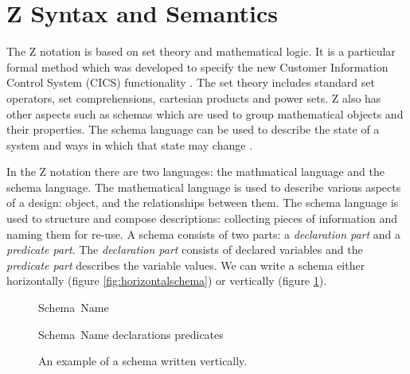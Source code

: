 \section{Z Syntax and Semantics}

The Z notation is based on set theory and mathematical logic. It is a particular formal method which was developed to specify the new Customer Information Control System (CICS) functionality \cite{cics}. The set theory includes standard set operators, set comprehensions, cartesian products and power sets. Z also has other aspects such as schemas which are used to group mathematical objects and their properties. The schema language can be used to describe the state of a system and ways in which that state may change \cite{Woodcock:1996:UZS:235337}.

In the Z notation there are two languages: the mathmatical language and the schema language. The mathematical language is used to describe various aspects of a design: object, and the relationships between them. The schema language is used to structure and compose descriptions: collecting pieces of information and naming them for re-use. A schema consists of two parts: a \emph{declaration part} and a \emph{predicate part}. The \emph{declaration part} consists of declared variables and the \emph{predicate part} describes the variable values. We can write a schema either horizontally (figure \ref{fig:horizontalschema}) or vertically (figure \ref{fig:verticalschema}).

\begin{figure}[H]
\vspace{-0.2in}
\centering
\begin{minipage}{0.45\textwidth}
\begin{zed}
\noindent Schema\ Name 
\end{zed}
\vspace{-0.18in}
\caption{An example of a schema written horizontally.\label{fig:horizontalschema}}
\vspace{-0.2in}
\end{minipage}\hfill
\begin{minipage}{0.45\textwidth}
\begin{schema}{Schema\ Name}
declarations
\where
predicates
\end{schema}
\vspace{-0.2in}
\caption{An example of a schema written vertically. \label{fig:verticalschema}}
\vspace{-0.2in}
\end{minipage}
\end{figure}

